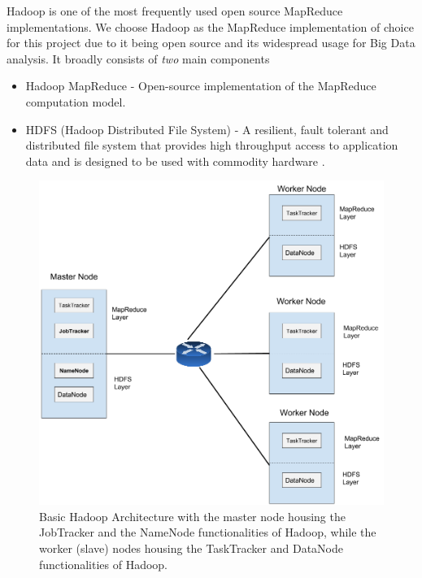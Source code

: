 Hadoop is one of the most frequently used open source MapReduce implementations. We choose Hadoop as the MapReduce implementation of choice for this project due to it being open source and its widespread usage for Big Data analysis. It broadly consists of \textit{two} main components   
\begin{itemize}
\item Hadoop MapReduce - Open-source implementation of the MapReduce computation model.
\item HDFS (Hadoop Distributed File System) - A resilient, fault tolerant and distributed file system that provides high throughput access to application data and is designed to be used with commodity hardware \cite{borthakur2008hdfs}.
\end{itemize}
\begin{figure}[!ht]
\centerline{\includegraphics[scale=0.35]{HadoopArchitecture.png}}
\caption{Basic Hadoop Architecture with the master node housing the JobTracker and the NameNode functionalities of Hadoop, while the worker (slave) nodes housing the TaskTracker and DataNode functionalities of Hadoop.}
\label{fig:HadoopArchitecture}
\end{figure}


